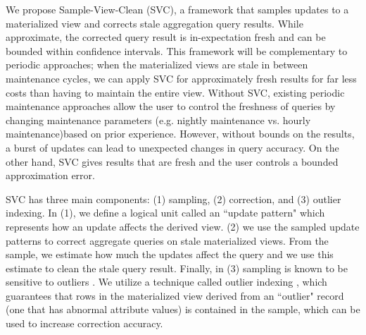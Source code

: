 We propose Sample-View-Clean (SVC), a framework that samples updates to a materialized view and corrects stale aggregation query results.
While approximate, the corrected query result is in-expectation fresh and can be bounded within confidence intervals.
This framework will be complementary to periodic approaches; when the materialized views are stale in between maintenance cycles, we can apply SVC for approximately fresh results for far less costs than having to maintain the entire view.
Without SVC, existing periodic maintenance approaches allow the user to control the freshness of queries by changing maintenance parameters (e.g. nightly maintenance vs. hourly maintenance)based on prior experience.
However, without bounds on the results, a burst of updates can lead to unexpected changes in query accuracy.
On the other hand, SVC gives results that are fresh and the user controls a bounded approximation error.



SVC has three main components: (1) sampling, (2) correction, and (3) outlier indexing. In (1), we define a logical unit called an ``update pattern" which represents how an update affects the derived view. (2) we use the sampled update patterns to correct aggregate queries on stale materialized views.
From the sample, we estimate how much the updates affect the query and we use this estimate to clean the stale query result.
Finally, in (3) sampling is known to be sensitive to outliers \cite{chaudhuri2001overcoming}.
We utilize a technique called outlier indexing \cite{chaudhuri2001overcoming}, which guarantees that rows in the materialized view derived from an ``outlier" record (one that has abnormal attribute values) is contained in the sample, which can be used to increase correction accuracy.

